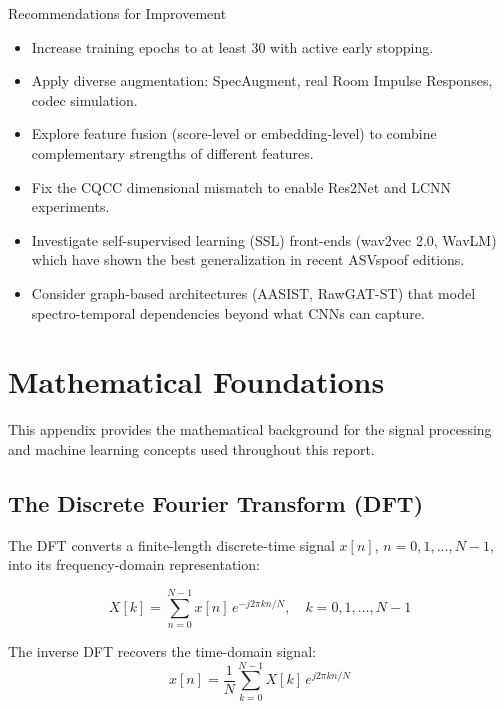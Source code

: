 \documentclass[12pt]{report}
\begin{document}
\begin{genbox}{Recommendations for Improvement}
\begin{itemize}[noitemsep]
    \item Increase training epochs to at least 30 with active early stopping.
    \item Apply diverse augmentation: SpecAugment, real Room Impulse Responses, codec simulation.
    \item Explore feature fusion (score-level or embedding-level) to combine complementary
          strengths of different features.
    \item Fix the CQCC dimensional mismatch to enable Res2Net and LCNN experiments.
    \item Investigate self-supervised learning (SSL) front-ends (wav2vec 2.0, WavLM) which
          have shown the best generalization in recent ASVspoof editions.
    \item Consider graph-based architectures (AASIST, RawGAT-ST) that model spectro-temporal
          dependencies beyond what CNNs can capture.
\end{itemize}
\end{genbox}


\appendix
\chapter{Mathematical Foundations}

This appendix provides the mathematical background for the signal processing and machine
learning concepts used throughout this report.


\section{The Discrete Fourier Transform (DFT)}

The DFT converts a finite-length discrete-time signal $x[n]$, $n = 0, 1, \ldots, N-1$,
into its frequency-domain representation:

\begin{equation}
    X[k] = \sum_{n=0}^{N-1} x[n] \, e^{-j 2\pi k n / N}, \quad k = 0, 1, \ldots, N-1
    \label{eq:dft}
\end{equation}

The inverse DFT recovers the time-domain signal:
\begin{equation}
    x[n] = \frac{1}{N} \sum_{k=0}^{N-1} X[k] \, e^{j 2\pi k n / N}
    \label{eq:idft}
\end{equation}
\end{document}
